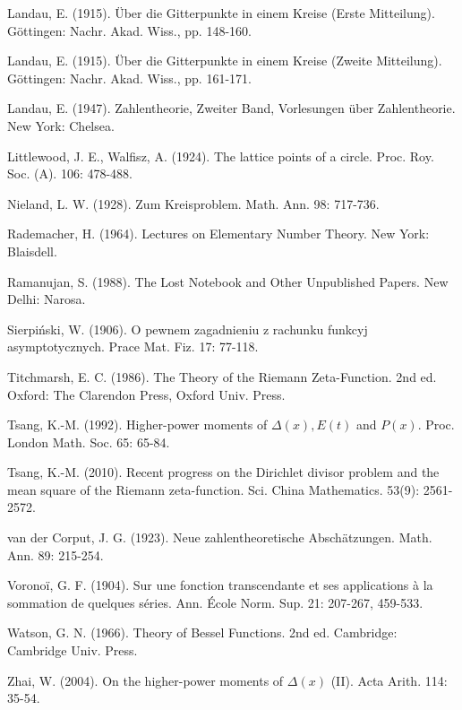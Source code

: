 \documentclass[10pt]{article}
\theoremstyle{plain}
\begin{document}
\begin{list}{}{\setlength{\leftmargin}{2.7em}\setlength{\labelwidth}{2.2em}\setlength{\itemindent}{-2.7em}\setlength{\itemsep}{0.25ex}\small}
  \item[{[27]}] Landau, E. (1915). Über die Gitterpunkte in einem Kreise (Erste Mitteilung). Göttingen: Nachr. Akad. Wiss., pp. 148-160.
  \item[{[28]}] Landau, E. (1915). Über die Gitterpunkte in einem Kreise (Zweite Mitteilung). Göttingen: Nachr. Akad. Wiss., pp. 161-171.
  \item[{[29]}] Landau, E. (1947). Zahlentheorie, Zweiter Band, Vorlesungen über Zahlentheorie. New York: Chelsea.
  \item[{[30]}] Littlewood, J. E., Walfisz, A. (1924). The lattice points of a circle. Proc. Roy. Soc. (A). 106: 478-488.
  \item[{[31]}] Nieland, L. W. (1928). Zum Kreisproblem. Math. Ann. 98: 717-736.
  \item[{[32]}] Rademacher, H. (1964). Lectures on Elementary Number Theory. New York: Blaisdell.
  \item[{[33]}] Ramanujan, S. (1988). The Lost Notebook and Other Unpublished Papers. New Delhi: Narosa.
  \item[{[34]}] Sierpiński, W. (1906). O pewnem zagadnieniu z rachunku funkcyj asymptotycznych. Prace Mat. Fiz. 17: 77-118.
  \item[{[35]}] Titchmarsh, E. C. (1986). The Theory of the Riemann Zeta-Function. 2nd ed. Oxford: The Clarendon Press, Oxford Univ. Press.
  \item[{[36]}] Tsang, K.-M. (1992). Higher-power moments of $\Delta(x), E(t)$ and $P(x)$. Proc. London Math. Soc. 65: 65-84.
  \item[{[37]}] Tsang, K.-M. (2010). Recent progress on the Dirichlet divisor problem and the mean square of the Riemann zeta-function. Sci. China Mathematics. 53(9): 2561-2572.
  \item[{[38]}] van der Corput, J. G. (1923). Neue zahlentheoretische Abschätzungen. Math. Ann. 89: 215-254.
  \item[{[39]}] Voronoï, G. F. (1904). Sur une fonction transcendante et ses applications à la sommation de quelques séries. Ann. École Norm. Sup. 21: 207-267, 459-533.
  \item[{[40]}] Watson, G. N. (1966). Theory of Bessel Functions. 2nd ed. Cambridge: Cambridge Univ. Press.
  \item[{[41]}] Zhai, W. (2004). On the higher-power moments of $\Delta(x)$ (II). Acta Arith. 114: 35-54.
\end{list}
\end{document}
